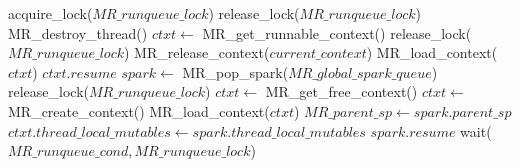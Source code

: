 \begin{algorithm}[htb]
\begin{algorithmic}
  \State acquire\_lock($MR\_runqueue\_lock$)
  \Loop
      \State release\_lock($MR\_runqueue\_lock$)
      \State MR\_destroy\_thread()
    \EndIf
    \State $ctxt \gets$ MR\_get\_runnable\_context()
      \State release\_lock($MR\_runqueue\_lock$)
        \State MR\_release\_context($current\_context$)
      \EndIf
      \State MR\_load\_context($ctxt$)
      \Goto $ctxt.resume$
    \EndIf
    \State $spark \gets$ MR\_pop\_spark($MR\_global\_spark\_queue$)
      \State release\_lock($MR\_runqueue\_lock$)
        \State $ctxt \gets$ MR\_get\_free\_context()
          \State $ctxt \gets$ MR\_create\_context()
        \EndIf
        \State MR\_load\_context($ctxt$)
      \EndIf
      \State $MR\_parent\_sp \gets spark.parent\_sp$
      \State $ctxt.thread\_local\_mutables \gets
        spark.thread\_local\_mutables$
      \Goto $spark.resume$
    \EndIf
    \State wait($MR\_runqueue\_cond, MR\_runqueue\_lock$)
  \EndLoop
\EndProcedure
\end{algorithmic}
\caption{\getglobalwork}
\label{alg:MR_get_global_work}
\end{algorithm}

